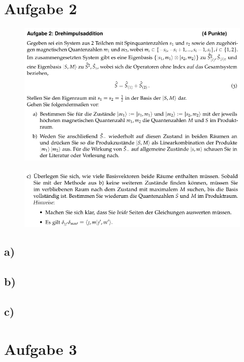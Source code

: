 \section{Aufgabe 2}

    \begin{figure}[H]
        \centering
        \includegraphics[width=\textwidth]{images/Aufgabe2a.jpg}
        \label{fig:2}
    \end{figure}

    \begin{figure}[H]
        \centering
        \includegraphics[width=\textwidth]{images/Aufgabe2b.jpg}
        \label{fig:3}
    \end{figure}

\subsection{a)}

\subsection{b)}

\subsection{c)}

\section{Aufgabe 3}

